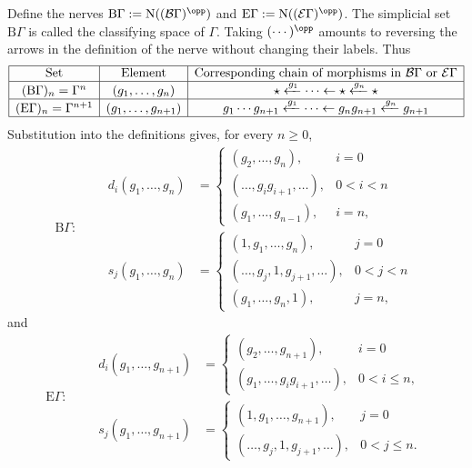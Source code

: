 \begin{example}
	Define the nerves
	$\mathrm{B}\Gamma:=\mathrm{N}((\mathcal{B}\Gamma)^{\opp})$ and
	$\mathrm{E}\Gamma:=\mathrm{N}((\mathcal{E}\Gamma)^{\opp})$.
	The simplicial set $\mathrm{B}\Gamma$ is called the classifying space of
	$\Gamma$. Taking $(\cdots)^{\opp}$ amounts to reversing the arrows in the
	definition of the nerve without changing their labels. Thus
	\begin{equation*}
		\begin{array}{|c|c|c|} \hline
		\text{Set} & \text{Element} & \text{Corresponding chain of morphisms in }\mathcal{B}\Gamma\text{ or }\mathcal{E}\Gamma \\ \hline
		(\mathrm{B}\Gamma)_n = \Gamma^n & (g_1, \ldots, g_n) & \star \xleftarrow{g_1} \cdots \leftarrow \star \xleftarrow{g_n} \star \\ \hline
		(\mathrm{E}\Gamma)_n = \Gamma^{n+1} & (g_1, \ldots, g_{n+1}) & g_1 \cdots g_{n+1} \xleftarrow{g_1} \cdots \leftarrow g_n g_{n+1} \xleftarrow{g_n} g_{n+1} \\ \hline
		\end{array}
	\end{equation*}
	Substitution into the definitions gives, for every $n\geq0$,
	\begin{equation*}
		\mathrm{B}\Gamma: \qquad \begin{aligned}
			d_i(g_1, \ldots, g_n) & =
			\begin{cases}
				(g_2, \ldots, g_n), & i = 0 \\
				(\ldots, g_i g_{i+1} , \ldots), & 0 < i < n \\
				(g_1, \ldots, g_{n-1}), & i = n,
			\end{cases} \\
			s_j(g_1, \ldots, g_n) & =
			\begin{cases}
				(1, g_1, \ldots, g_n), & j = 0 \\
				(\ldots, g_j, 1, g_{j+1}, \ldots), & 0 < j < n \\
				(g_1, \ldots, g_n, 1), & j = n,
			\end{cases}
		\end{aligned}
	\end{equation*}
	and
	\begin{equation*}
		\mathrm{E}\Gamma: \qquad \begin{aligned}
			d_i(g_1, \ldots, g_{n+1}) & =
			\begin{cases}
				(g_2, \ldots, g_{n+1}), & i = 0 \\
				(g_1, \ldots, g_i g_{i+1} , \ldots), & 0 < i \leq n,
			\end{cases} \\
			s_j(g_1, \ldots, g_{n+1}) & =
			\begin{cases}
				(1, g_1, \ldots, g_{n+1}), & j = 0 \\
				(\ldots, g_j, 1, g_{j+1}, \ldots), & 0 < j \leq n.
			\end{cases}
		\end{aligned}
	\end{equation*}


\end{example}
